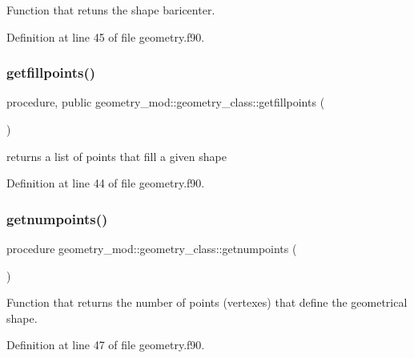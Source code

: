 Function that retuns the shape baricenter. 



Definition at line 45 of file geometry.\+f90.

\mbox{\label{structgeometry__mod_1_1geometry__class_aff5dcf860e40f15d8a509f9bc2acdab3}} 
\subsubsection{\texorpdfstring{getfillpoints()}{getfillpoints()}}
{\footnotesize\ttfamily procedure, public geometry\+\_\+mod\+::geometry\+\_\+class\+::getfillpoints (\begin{DoxyParamCaption}{ }\end{DoxyParamCaption})}



returns a list of points that fill a given shape 



Definition at line 44 of file geometry.\+f90.

\mbox{\label{structgeometry__mod_1_1geometry__class_a8988388d683fbf7e5727a39b71d3c479}} 
\subsubsection{\texorpdfstring{getnumpoints()}{getnumpoints()}}
{\footnotesize\ttfamily procedure geometry\+\_\+mod\+::geometry\+\_\+class\+::getnumpoints (\begin{DoxyParamCaption}{ }\end{DoxyParamCaption})\hspace{0.3cm}{\ttfamily [private]}}



Function that returns the number of points (vertexes) that define the geometrical shape. 



Definition at line 47 of file geometry.\+f90.

